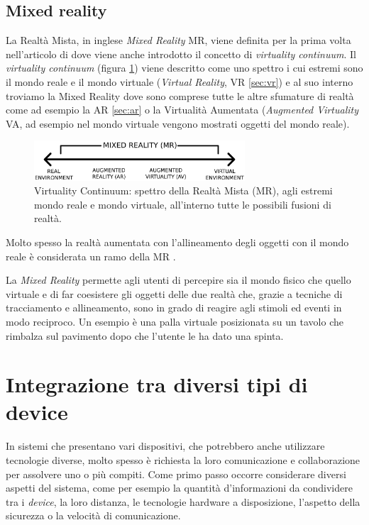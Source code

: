\subsection{Mixed reality}
La Realtà Mista, in inglese \textit{Mixed Reality} MR, viene definita per la prima volta nell'articolo  \cite{MilgramMRTaxonomy} di  dove viene anche introdotto il concetto di \textit{virtuality continuum}.
Il \textit{virtuality continuum} (figura \ref{fig:virtualcontinuum}) viene descritto come uno spettro i cui estremi sono il mondo reale e il mondo virtuale (\textit{Virtual Reality}, VR \ref{sec:vr}) e al suo interno troviamo la Mixed Reality dove sono comprese tutte le altre sfumature di realtà come ad esempio la AR \ref{sec:ar} o la Virtualità Aumentata (\textit{Augmented Virtuality} VA, ad esempio nel mondo virtuale vengono mostrati oggetti del mondo reale).
\begin{figure} [h]
    \centering
    \includegraphics[width=0.7\textwidth]{img/Reality-Virtuality_Continuum.png}
    \caption{Virtuality Continuum: spettro della Realtà Mista (MR), agli estremi mondo reale e mondo virtuale, all'interno tutte le possibili fusioni di realtà.}
    \label{fig:virtualcontinuum}
\end{figure}

Molto spesso la realtà aumentata con l'allineamento degli oggetti con il mondo reale è considerata un ramo della MR \cite{MRsurvey}.

La \textit{Mixed Reality} permette agli utenti di percepire sia il mondo fisico che quello virtuale e di far coesistere gli oggetti delle due realtà che, grazie a tecniche di tracciamento e allineamento, sono in grado di reagire agli stimoli ed eventi in modo reciproco. Un esempio è una palla virtuale posizionata su un tavolo che rimbalza sul pavimento dopo che l'utente le ha dato una spinta.

\section{Integrazione tra diversi tipi di device}
In sistemi che presentano vari dispositivi, che potrebbero anche utilizzare tecnologie diverse, molto spesso è richiesta la loro comunicazione e collaborazione per assolvere uno o più compiti.
Come primo passo occorre considerare diversi aspetti del sistema, come per esempio la quantità d'informazioni da condividere tra i \textit{device}, la loro distanza, le tecnologie hardware a disposizione, l'aspetto della sicurezza o la velocità di comunicazione.

